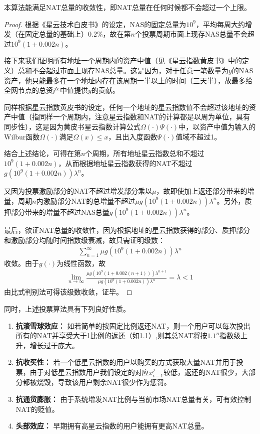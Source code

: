 \begin{property}
本算法能满足NAT总量的收敛性，即NAT总量在任何时候都不会超过一个上限。
\end{property}
\begin{proof}
	根据《星云技术白皮书》的设定，NAS的固定总量为$10^9$，平均每周大约增发（在固定总量的基础上）$0.2\%$，故在第$n$个投票周期市面上现存NAS总量不会超过$10^9(1+0.002n)$。
	
	接下来我们证明所有地址一个周期内的资产中值（见《星云指数黄皮书》中的定义）总和不会超过市面上现存NAS总量。这是因为，对于任意一笔数量为$y$的NAS资产，他只能最多在一个地址内存在该周期一半以上的时间（三天半），故最多给全网节点的总资产中值提供$y$的贡献。
	
	同样根据星云指数黄皮书的设定，任何一个地址的星云指数值不会超过该地址的资产中值（指同样一个周期内，注意星云指数和NAT的计算都是以周为单位，具有同步性），这是因为黄皮书星云指数计算公式$\Omega(\cdot)\Psi(\cdot)$中，以资产中值为输入的Wilbur函数$\Omega(\cdot)$满足$\Omega(x)\leq x$，且出入度函数$\Psi(\cdot)$值域不超过1。
	
	结合上述结论，可得在第$n$个周期，所有地址星云指数总和不超过$10^9(1+0.002n)$，从而根据地址星云指数获得的NAT不超过$g(10^9(1+0.002n))\lambda^n$。
	
	又因为投票激励部分的NAT不超过增发部分乘以$\mu$，故即使加上返还部分带来的增量，周期$n$内激励部分NAT的总增量不超过$\mu g(10^9(1+0.002n))\lambda^n$。另外，质押部分带来的增量不超过NAS总量$g(10^9(1+0.002n))\lambda^n$。
	
	最后，欲证NAT总量的收敛性，因为根据地址的星云指数获得的部分、质押部分和激励部分均随时间指数级衰减，故只需证明级数：
	\begin{align}
	\sum_{n=1}^{\infty} \mu g(10^9(1+0.002n))\lambda^n
	\end{align}
	收敛。由于$g(\cdot)$为线性函数，故
	\begin{align}
	\lim_{n\rightarrow \infty} \frac{\mu g(10^9(1+0.002(n+1)))\lambda^{n+1}}{\mu g(10^9(1+0.002n))\lambda^n} = \lambda <1
	\end{align}
	由比式判别法可得该级数收敛，证毕。
\end{proof}
同时，上述投票算法具有下列良好性质。
\begin{enumerate}
	\item \textbf{抗滚雪球效应：} 如若简单的按固定比例返还NAT，则一个用户可以每次投出所有的NAT并享受大于1比例的返还（如1.1）,则其总NAT将按$1.1^n$指数级上升，增长过于庞大。
	\item \textbf{抗收买性：} 若一个低星云指数的用户以购买的方式获取大量NAT并用于投票，由于对低星云指数用户我们设定的对应$x_{i-1}^j$较低，返还的NAT很少，大部分都被烧毁，导致该用户剩余NAT很少作为惩罚。
	\item \textbf{抗通货膨胀：} 由于系统增发NAT比例与当前市场NAT总量有关，可有效控制NAT的贬值。
	\item \textbf{头部效应：} 早期拥有高星云指数的用户能拥有更高NAT总量。
\end{enumerate}
